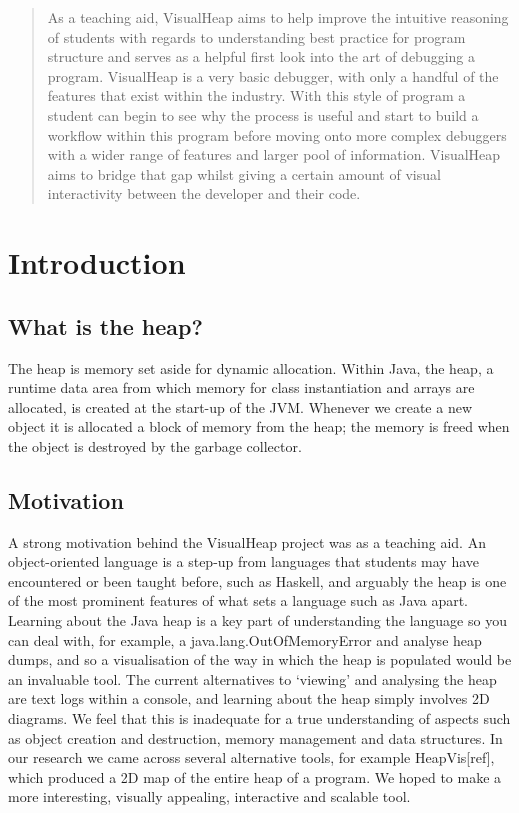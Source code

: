 \documentclass[11pt, a4paper]{report}
\begin{document}
\begin{abstract}
As a teaching aid, VisualHeap aims to help improve the intuitive reasoning of students with regards to understanding best practice for program structure and serves as a helpful first look into the art of debugging a program. VisualHeap is a very basic debugger, with only a handful of the features that exist within the industry. With this style of program a student can begin to see why the process is useful and start to build a workflow within this program before moving onto more complex debuggers with a wider range of features and larger pool of information.  VisualHeap aims to bridge that gap whilst giving a certain amount of visual interactivity between the developer and their code. 
\end{abstract}

\chapter{Introduction}
\section{What is the heap?}

The heap is memory set aside for dynamic allocation. Within Java, the heap, a runtime data area from which memory for class instantiation and arrays are allocated, is created at the start-up of the JVM. Whenever we create a new object it is allocated a block of memory from the heap; the memory is freed when the object is destroyed by the garbage collector.

\section{Motivation}

A strong motivation behind the VisualHeap project was as a teaching aid. An object-oriented language is a step-up from languages that students may have encountered or been taught before, such as Haskell, and arguably the heap is one of the most prominent features of what sets a language such as Java apart. Learning about the Java heap is a key part of understanding the language so you can deal with, for example, a java.lang.OutOfMemoryError and analyse heap dumps, and so a visualisation of the way in which the heap is populated would be an invaluable tool. The current alternatives to ‘viewing’ and analysing the heap are text logs within a console, and learning about the heap simply involves 2D diagrams. We feel that this is inadequate for a true understanding of aspects such as object creation and destruction, memory management and data structures. In our research we came across several alternative tools, for example HeapVis[ref], which produced a 2D map of the entire heap of a program. We hoped to make a more interesting, visually appealing, interactive and scalable tool. 
\end{document}
